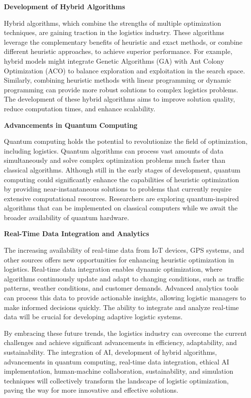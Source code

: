 \documentclass{article}
\begin{document}
    \textbf{Development of Hybrid Algorithms}

    Hybrid algorithms, which combine the strengths of multiple optimization techniques, are gaining traction in the logistics industry. These algorithms leverage the complementary benefits of heuristic and exact methods, or combine different heuristic approaches, to achieve superior performance. For example, hybrid models might integrate Genetic Algorithms (GA) with Ant Colony Optimization (ACO) to balance exploration and exploitation in the search space. Similarly, combining heuristic methods with linear programming or dynamic programming can provide more robust solutions to complex logistics problems. The development of these hybrid algorithms aims to improve solution quality, reduce computation times, and enhance scalability. \cite{vidal2013}

    \textbf{Advancements in Quantum Computing}

    Quantum computing holds the potential to revolutionize the field of optimization, including logistics. Quantum algorithms can process vast amounts of data simultaneously and solve complex optimization problems much faster than classical algorithms. Although still in the early stages of development, quantum computing could significantly enhance the capabilities of heuristic optimization by providing near-instantaneous solutions to problems that currently require extensive computational resources. Researchers are exploring quantum-inspired algorithms that can be implemented on classical computers while we await the broader availability of quantum hardware. \cite{toth2014vehicle}

    \textbf{Real-Time Data Integration and Analytics}

    The increasing availability of real-time data from IoT devices, GPS systems, and other sources offers new opportunities for enhancing heuristic optimization in logistics. Real-time data integration enables dynamic optimization, where algorithms continuously update and adapt to changing conditions, such as traffic patterns, weather conditions, and customer demands. Advanced analytics tools can process this data to provide actionable insights, allowing logistic managers to make informed decisions quickly. The ability to integrate and analyze real-time data will be crucial for developing adaptive  logistic systems. \cite{toth2014vehicle}


    By embracing these future trends, the logistics industry can overcome the current challenges and achieve significant advancements in efficiency, adaptability, and sustainability. The integration of AI, development of hybrid algorithms, advancements in quantum computing, real-time data integration, ethical AI implementation, human-machine collaboration, sustainability, and simulation techniques will collectively transform the landscape of logistic optimization, paving the way for more innovative and effective solutions.
\end{document}
